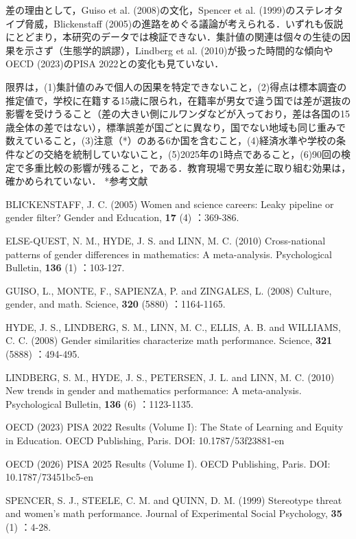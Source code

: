 \documentclass[a4paper,10pt,twocolumn]{ltjsarticle}
\makeatletter
\renewcommand{\section}{\@startsection{section}{1}{\z@}{1.1\Cvs \@plus.4\Cdp \@minus.2\Cdp}{.5\Cvs \@plus.2\Cdp}{\normalfont\gtfamily\bfseries\large}}
\makeatother
\begin{document}
差の理由として，Guiso et al. (2008)の文化，Spencer et al. (1999)のステレオタイプ脅威，Blickenstaff (2005)の進路をめぐる議論が考えられる．いずれも仮説にとどまり，本研究のデータでは検証できない．集計値の関連は個々の生徒の因果を示さず（生態学的誤謬），Lindberg et al. (2010)が扱った時間的な傾向やOECD (2023)のPISA 2022との変化も見ていない．

限界は，(1)集計値のみで個人の因果を特定できないこと，(2)得点は標本調査の推定値で，学校に在籍する15歳に限られ，在籍率が男女で違う国では差が選抜の影響を受けうること（差の大きい側にルワンダなどが入っており，差は各国の15歳全体の差ではない），標準誤差が国ごとに異なり，国でない地域も同じ重みで数えていること，(3)注意（*）のある6か国を含むこと，(4)経済水準や学校の条件などの交絡を統制していないこと，(5)2025年の1時点であること，(6)90回の検定で多重比較の影響が残ること，である．教育現場で男女差に取り組む効果は，確かめられていない．
\section*{参考文献}
\begingroup\scriptsize\raggedright{} 
\begin{list}{}{\setlength{\leftmargin}{1.5\zw}\setlength{\itemindent}{-1.5\zw}\setlength{\labelwidth}{0pt}\setlength{\labelsep}{0pt}\setlength{\itemsep}{1pt}\setlength{\parsep}{0pt}\setlength{\topsep}{0pt}\setlength{\listparindent}{0pt}}
\item BLICKENSTAFF, J. C. (2005) Women and science careers: Leaky pipeline or gender filter? Gender and Education, \textbf{17} (4) ：369-386.
\item ELSE-QUEST, N. M., HYDE, J. S. and LINN, M. C. (2010) Cross-national patterns of gender differences in mathematics: A meta-analysis. Psychological Bulletin, \textbf{136} (1) ：103-127.
\item GUISO, L., MONTE, F., SAPIENZA, P. and ZINGALES, L. (2008) Culture, gender, and math. Science, \textbf{320} (5880) ：1164-1165.
\item HYDE, J. S., LINDBERG, S. M., LINN, M. C., ELLIS, A. B. and WILLIAMS, C. C. (2008) Gender similarities characterize math performance. Science, \textbf{321} (5888) ：494-495.
\item LINDBERG, S. M., HYDE, J. S., PETERSEN, J. L. and LINN, M. C. (2010) New trends in gender and mathematics performance: A meta-analysis. Psychological Bulletin, \textbf{136} (6) ：1123-1135.
\item OECD (2023) PISA 2022 Results (Volume I): The State of Learning and Equity in Education. OECD Publishing, Paris. DOI: 10.1787/53f23881-en
\item OECD (2026) PISA 2025 Results (Volume I). OECD Publishing, Paris. DOI: 10.1787/73451bc5-en
\item SPENCER, S. J., STEELE, C. M. and QUINN, D. M. (1999) Stereotype threat and women's math performance. Journal of Experimental Social Psychology, \textbf{35} (1) ：4-28.
\end{list}\endgroup
\end{document}
